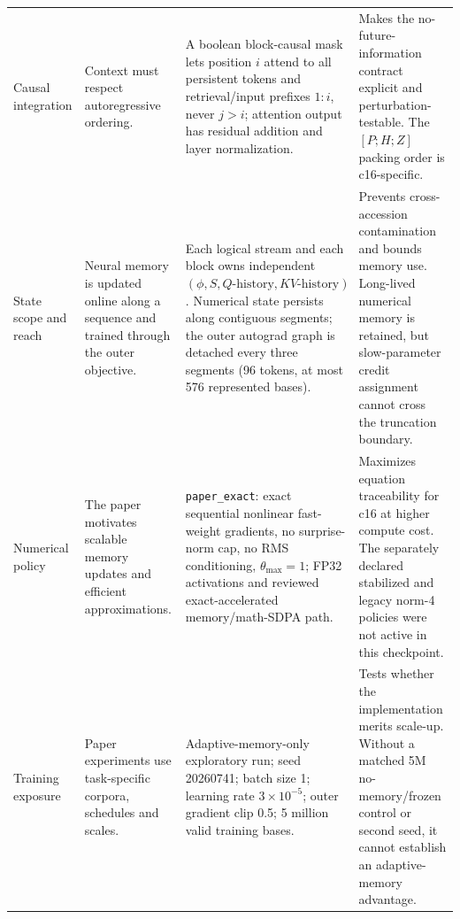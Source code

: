 \documentclass[10pt,twocolumn]{article}
\newcommand{\code}[1]{\texttt{#1}}
\begin{document}
\begin{table}[!t]
\begin{tabularx}{\textwidth}{@{}>{\raggedright\arraybackslash}p{}>{\raggedright\arraybackslash}p{}>{\raggedright\arraybackslash}p{}>{\raggedright\arraybackslash}X@{}}
Causal integration & Context must respect autoregressive ordering. & A boolean block-causal mask lets position $i$ attend to all persistent tokens and retrieval/input prefixes $1{:}i$, never $j>i$; attention output has residual addition and layer normalization. & Makes the no-future-information contract explicit and perturbation-testable. The $[P;H;Z]$ packing order is c16-specific.\\
State scope and reach & Neural memory is updated online along a sequence and trained through the outer objective. & Each logical stream and each block owns independent $(\phi,S,Q\text{-history},KV\text{-history})$. Numerical state persists along contiguous segments; the outer autograd graph is detached every three segments (96 tokens, at most 576 represented bases). & Prevents cross-accession contamination and bounds memory use. Long-lived numerical memory is retained, but slow-parameter credit assignment cannot cross the truncation boundary.\\
Numerical policy & The paper motivates scalable memory updates and efficient approximations. & \code{paper\_exact}: exact sequential nonlinear fast-weight gradients, no surprise-norm cap, no RMS conditioning, $\theta_{\max}=1$; FP32 activations and reviewed exact-accelerated memory/math-SDPA path. & Maximizes equation traceability for c16 at higher compute cost. The separately declared stabilized and legacy norm-4 policies were not active in this checkpoint.\\
Training exposure & Paper experiments use task-specific corpora, schedules and scales. & Adaptive-memory-only exploratory run; seed 20260741; batch size 1; learning rate $3\times10^{-5}$; outer gradient clip 0.5; 5 million valid training bases. & Tests whether the implementation merits scale-up. Without a matched 5M no-memory/frozen control or second seed, it cannot establish an adaptive-memory advantage.\\
\bottomrule
\end{tabularx}
\end{table}
\end{document}
